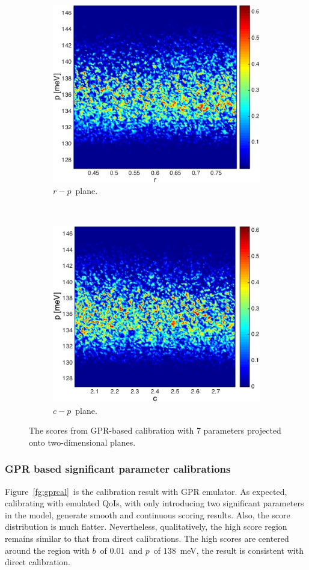 \documentclass[review]{elsarticle}
\begin{document}
\begin{figure}[ht!]
\begin{subfigure}{0.5\textwidth}
\centering
\includegraphics[width=0.9\linewidth]{NSE15-48R1_Figure11e.jpg}
\caption{$r-p$~plane.}
\end{subfigure}
~
\begin{subfigure}{0.5\textwidth}
\centering
\includegraphics[width=0.9\linewidth]{NSE15-48R1_Figure11f.jpg}
\caption{$c-p$~plane.}
\end{subfigure}
\caption{The scores from GPR-based calibration with 7 parameters projected onto two-dimensional planes.}
\label{gp7}
\end{figure}


\subsubsection{GPR based significant parameter calibrations}
Figure~\ref{fg:gprcal}~is the calibration result with GPR emulator. As expected, calibrating with emulated QoIs, with only introducing two significant parameters in the model, generate smooth and continuous scoring results. Also, the score distribution is much flatter. Nevertheless, qualitatively, the high score region remains similar to that from direct calibrations. The high scores are centered around the region with $b$~of $0.01$~and $p$~of $138$~meV, the result is consistent with direct calibration.
\end{document}
